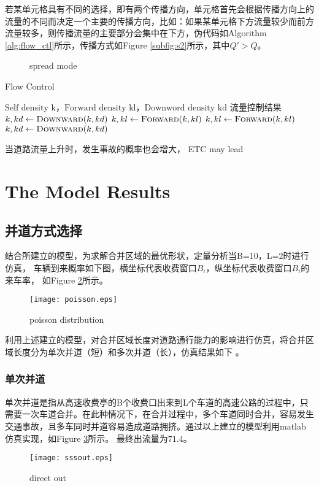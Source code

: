\documentclass{mcmthesis}
\begin{document}
若某单元格具有不同的选择，即有两个传播方向，单元格首先会根据传播方向上的流量的不同而决定一个主要的传播方向，比如：如果某单元格下方流量较少而前方流量较多，则传播流量的主要部分会集中在下方，伪代码如Algorithm \ref{alg:flow_ctl}所示，传播方式如Figure \ref{subfig:s2}所示，其中$Q'>Q$。
\begin{figure}[!htbp]
	\centering
	 \hspace{.3\textwidth}
	\caption{spread mode}
	\label{fig:sp_exm}
\end{figure}
\begin{algorithm}
	\begin{algorithmic}
	\caption{\label{alg:flow_ctl}Flow Control}
        \Require $\text{Self density k，Forward density kl，Downword density kd}$
		\Ensure $\text{流量控制结果}$
					\State $k,kd \gets \Call{Downward}{k,kd}$
					\State $k,kl \gets \Call{Forward}{k,kl}$
				\Else
					\State $k,kl \gets \Call{Forward}{k,kl}$
					\State $k,kd \gets \Call{Downward}{k,kd}$
			\EndIf
			\State {}
		\EndFunction
\end{algorithmic}
\end{algorithm}

当道路流量上升时，发生事故的概率也会增大，
ETC may lead\cite{spiliopoulou2009toll}

\section{The Model Results}
\subsection{并道方式选择}
结合所建立的模型，为求解合并区域的最优形状，定量分析当B=10，L=2时进行仿真，
车辆到来概率如下图，横坐标代表收费窗口$B_i$，纵坐标代表收费窗口$B_i$的来车率，
如Figure \ref{fig:poisson}所示。
\begin{figure}[!htbp]
	\small
	\centering
	\texttt{[image: poisson.eps]}
	\caption{\label{fig:poisson}poisson distribution} 
 \end{figure}

利用上述建立的模型，对合并区域长度对道路通行能力的影响进行仿真，将合并区域长度分为单次并道（短）和多次并道（长），仿真结果如下 。
\subsubsection{单次并道}
单次并道是指从高速收费亭的B个收费口出来到L个车道的高速公路的过程中，只需要一次车道合并。在此种情况下，在合并过程中，多个车道同时合并，容易发生交通事故，且多车同时并道容易造成道路拥挤。通过以上建立的模型利用matlab仿真实现，如Figure \ref{fig:direct_out}所示。
最终出流量为$71.4$。
\begin{figure}[!htbp]
	\small
	\centering
	\texttt{[image: sssout.eps]}
	\caption{\label{fig:direct_out}direct out} 
\end{figure}
\end{document}
